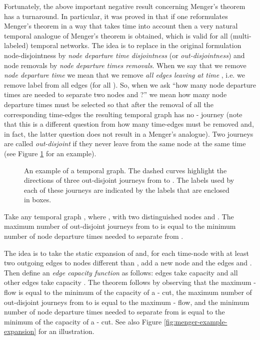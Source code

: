 \documentclass[oribibl, 11pt]{llncs}
\begin{document}
Fortunately, the above important negative result concerning Menger's theorem has a turnaround. In particular, it was proved in \cite{MMCS13} that if one reformulates Menger's theorem in a way that takes time into account then a very natural temporal analogue of Menger's theorem is obtained, which is valid for all (multi-labeled) temporal networks. The idea is to replace in the original formulation node-disjointness by \emph{node departure time disjointness} (or \emph{out-disjointness}) and node removals by \emph{node departure times removals}. When we say that we remove \emph{node departure time}  we mean that we remove \emph{all edges leaving  at time }, i.e. we remove label  from all  edges (for all ). So, when we ask ``how many node departure times are needed to separate two nodes  and ?'' we mean how many node departure times must be selected so that after the removal of all the corresponding time-edges the resulting temporal graph has no - journey (note that this is a different question from how many time-edges must be removed and, in fact, the latter question does not result in a Menger's analogue). Two journeys are called \emph{out-disjoint} if they never leave from the same node at the same time (see Figure \ref{fig:menger-example} for an example).

\begin{figure}[!hbtp]
   \caption{An example of a temporal graph. The dashed curves highlight the directions of three out-disjoint journeys from  to . The labels used by each of these journeys are indicated by the labels that are enclosed in boxes.} \label{fig:menger-example}
\end{figure}

\begin{theorem}  \label{the:dmeng}
Take any temporal graph , where , with two distinguished nodes  and . The maximum number of out-disjoint journeys from  to  is equal to the minimum number of node departure times needed to separate  from .  
\end{theorem}

The idea is to take the static expansion  of  and, for each time-node  with at least two outgoing edges to nodes different than , add a new node  and the edges  and  . Then define an \emph{edge capacity function } as follows: edges  take capacity  and all other edges take capacity . The theorem follows by observing that the maximum - flow is equal to the minimum of the capacity of a - cut, the maximum number of out-disjoint journeys from  to  is equal to the maximum - flow, and the minimum number of node departure times needed to separate  from  is equal to the minimum of the capacity of a - cut. See also Figure \ref{fig:menger-example-expansion} for an illustration.
\end{document}
